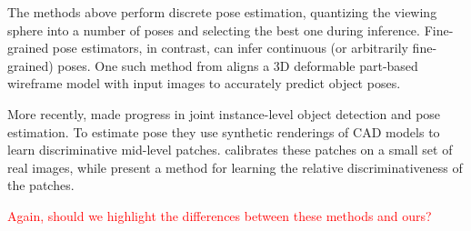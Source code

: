 \documentclass[10pt,twocolumn,letterpaper]{article}
\begin{document}
The methods above perform discrete pose estimation, quantizing the viewing
sphere into a number of poses and selecting the best one during inference.
Fine-grained pose estimators, in contrast, can infer continuous (or arbitrarily
fine-grained) poses. One such method from \cite{Zia13} aligns a 3D deformable
part-based wireframe model with input images to accurately predict object poses.

More recently, \cite{Aubry14, Lim14} made progress in joint instance-level
object detection and pose estimation. To estimate pose they use synthetic
renderings of CAD models to learn discriminative mid-level patches.
\cite{Aubry14} calibrates these patches on a small set of real images, while
\cite{Lim14} present a method for learning the relative discriminativeness of
the patches.

\textcolor{red}{Again, should we highlight the differences between these methods and ours?}

  
\end{document}
